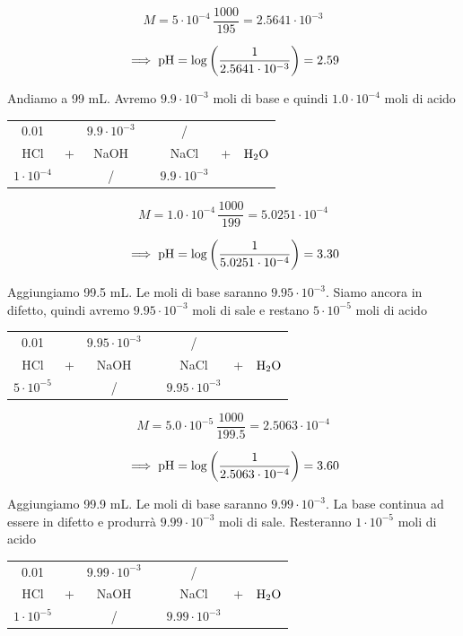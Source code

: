 $$M=5 \cdot 10^{-4} \, \frac{1000}{195}=2.5641 \cdot 10^{-3}$$

$$\implies \rm pH=\log \left( \frac{1}{2.5641 \cdot 10^{-3}} \right)=2.59$$

Andiamo a 99 mL. Avremo $9.9 \cdot 10^{-3}$ moli di base e quindi $1.0 \cdot 10^{-4}$ moli di acido

\begin{center}
    \begin{tabular}{ccccccc}
        0.01 &  & $9.9 \cdot 10^{-3}$  & & / & &\\
        HCl & + & NaOH & \ce{->} & NaCl & + & $\rm H_2O$\\
        $1 \cdot 10^{-4}$ &  &  / & & $9.9 \cdot 10^{-3}$ & &\\
    \end{tabular}
\end{center}

$$M=1.0 \cdot 10^{-4} \, \frac{1000}{199}=5.0251\cdot 10^{-4}$$

$$\implies \rm pH=\log \left( \frac{1}{5.0251\cdot 10^{-4}} \right)=3.30$$

Aggiungiamo 99.5 mL. Le moli di base saranno $9.95 \cdot 10^{-3}$. Siamo ancora in difetto, quindi avremo $9.95 \cdot 10^{-3}$ moli di sale e restano $5 \cdot 10^{-5}$ moli di acido

\begin{center}
    \begin{tabular}{ccccccc}
        0.01 &  & $9.95 \cdot 10^{-3}$  & & / & &\\
        HCl & + & NaOH & \ce{->} & NaCl & + & $\rm H_2O$\\
        $5 \cdot 10^{-5}$ &  &  / & & $9.95 \cdot 10^{-3}$ & &\\
    \end{tabular}
\end{center}

$$M=5.0 \cdot 10^{-5} \, \frac{1000}{199.5}=2.5063 \cdot 10^{-4}$$

$$\implies \rm pH=\log \left( \frac{1}{2.5063 \cdot 10^{-4}} \right)=3.60$$

Aggiungiamo 99.9 mL. Le moli di base saranno $9.99 \cdot 10^{-3}$. La base continua ad essere in difetto e produrrà $9.99 \cdot 10^{-3}$ moli di sale. Resteranno $1 \cdot 10^{-5}$ moli di acido

\begin{center}
    \begin{tabular}{ccccccc}
        0.01 &  & $9.99 \cdot 10^{-3}$  & & / & &\\
        HCl & + & NaOH & \ce{->} & NaCl & + & $\rm H_2O$\\
        $1 \cdot 10^{-5}$ &  &  / & & $9.99 \cdot 10^{-3}$ & &\\
    \end{tabular}
\end{center}


